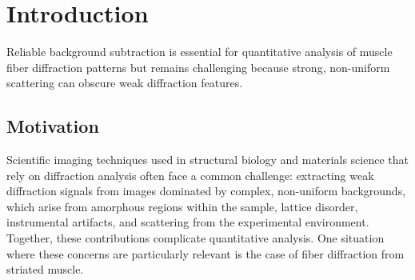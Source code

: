 \documentclass[iucr]{iucrjournals}
\begin{document}
\begin{abstract}

Accurate background subtraction is a critical preprocessing step for quantitative analysis of X-ray fiber diffraction patterns from striated muscle but is often performed heuristically, with limited guidance for parameter selection, leading to variability in downstream quantitative analyses. We present a unified framework that systematically evaluates and optimizes background subtraction methods using physically motivated image-quality metrics and synthetic signal validation to perform automated parameter search. Applied to synchrotron X-ray muscle fiber diffraction datasets, the framework improves subtraction consistency relative to ad hoc settings while preserving key diffraction features such as equatorial reflections and layer lines, and the resulting aggregate loss correlates with expert visual assessment and highlights characteristic failure modes of different subtraction strategies. Although developed for striated muscle diffraction, the approach is based on general signal and background properties and can be extended to other classes of fiber diffraction data. By formalizing evaluation and optimization, it supports more reliable quantitative analysis of synchrotron diffraction experiments.

\end{abstract}




\section{Introduction}

Reliable background subtraction is essential for quantitative analysis of muscle fiber diffraction patterns but remains challenging because strong, non-uniform scattering can obscure weak diffraction features.

\subsection{Motivation}

Scientific imaging techniques used in structural biology and materials science that rely on diffraction analysis often face a common challenge: extracting weak diffraction signals from images dominated by complex, non-uniform backgrounds, which arise from amorphous regions within the sample, lattice disorder, instrumental artifacts, and scattering from the experimental environment. Together, these contributions complicate quantitative analysis. One situation where these concerns are particularly relevant is the case of fiber diffraction from striated muscle.
\end{document}

